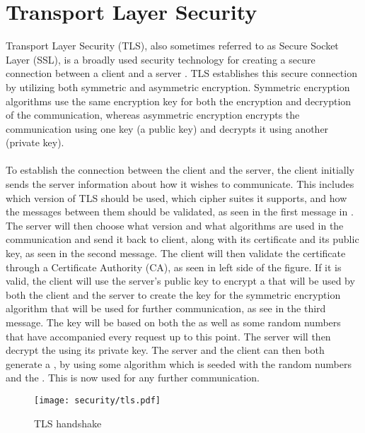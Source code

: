 
\section{Transport Layer Security}
\label{sec:transport_layer_security}

Transport Layer Security (TLS), also sometimes referred to as Secure Socket Layer (SSL), is a broadly used security technology for creating a secure connection between a client and a server \parencite{transport_layer_security}. TLS establishes this secure connection by utilizing both symmetric and asymmetric encryption. Symmetric encryption algorithms use the same encryption key for both the encryption and decryption of the communication, whereas asymmetric encryption encrypts the communication using one key (a public key) and decrypts it using another (private key). 
\\\\
To establish the connection between the client and the server, the client initially sends the server information about how it wishes to communicate. This includes which version of TLS should be used, which cipher suites it supports, and how the messages between them should be validated, as seen in the first message in . The server will then choose what version and what algorithms are used in the communication and send it back to client, along with its certificate and its public key, as seen in the second message. The client will then validate the certificate through a Certificate Authority (CA), as seen in left side of the figure. If it is valid, the client will use the server's public key to encrypt a  that will be used by both the client and the server to create the key for the symmetric encryption algorithm that will be used for further communication, as see in the third message. The key will be based on both the  as well as some random numbers that have accompanied every request up to this point. The server will then decrypt the  using its private key. The server and the client can then both generate a , by using some algorithm which is seeded with the random numbers and the . This  is now used for any further communication.

\begin{figure}[!htbp]
    \centering
    \texttt{[image: security/tls.pdf]}
    \caption{TLS handshake}
    \label{fig:tls}
\end{figure}
\FloatBarrier

